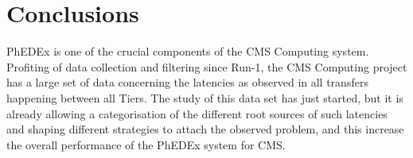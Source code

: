\section{Conclusions}
\label{sec:conclusions}

PhEDEx is one of the crucial components of the CMS Computing
system. Profiting of data collection and filtering since Run-1, the
CMS Computing project has a large set of data concerning the latencies
as observed in all transfers happening between all Tiers. The study of
this data set has just started, but it is already allowing a
categorisation of the different root sources of such latencies and
shaping different strategies to attach the observed problem, and this
increase the overall performance of the PhEDEx system for CMS.
